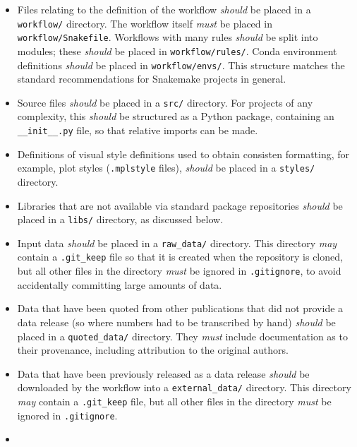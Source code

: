 \documentclass{article}
\newcommand\rfcword[1]{\emph{#1}\xspace}
\newcommand\must{\rfcword{must}}
\newcommand\should{\rfcword{should}}
\newcommand\may{\rfcword{may}}
\newcommand\filename[1]{\texttt{#1}\xspace}
\begin{document}
\begin{itemize}
  \item
        Files relating to the definition of the workflow \should be placed in a \filename{workflow/} directory.
        The workflow itself \must be placed in \filename{workflow/Snakefile}.
        Workflows with many rules \should be split into modules;
        these \should be placed in \filename{workflow/rules/}.
        Conda environment definitions \should be placed in \filename{workflow/envs/}.
        This structure matches the standard recommendations for Snakemake projects in general.
  \item
        Source files \should be placed in a \filename{src/} directory.
        For projects of any complexity,
        this \should be structured as a Python package,
        containing an \filename{\_\_init\_\_.py} file,
        so that relative imports can be made.
  \item
        Definitions of visual style definitions used to obtain consisten formatting,
        for example,
        plot styles (\verb|.mplstyle| files),
        \should be placed in a \filename{styles/} directory.
  \item
        Libraries that are not available via standard package repositories
        \should be placed in a \filename{libs/} directory,
        as discussed below.
  \item
        Input data \should be placed in a \filename{raw\_data/} directory.
        This directory \may contain a \filename{.git\_keep} file
        so that it is created when the repository is cloned,
        but all other files in the directory \must be ignored in \filename{.gitignore},
        to avoid accidentally committing large amounts of data.
  \item
        Data that have been quoted from other publications
        that did not provide a data release
        (so where numbers had to be transcribed by hand)
        \should be placed in a \filename{quoted\_data/} directory.
        They \must include documentation as to their provenance,
        including attribution to the original authors.
  \item
        Data that have been previously released as a data release
        \should be downloaded by the workflow
        into a \filename{external\_data/} directory.
        This directory \may contain a \filename{.git\_keep} file,
        but all other files in the directory \must be ignored in \filename{.gitignore}.
  \item

\end{itemize}
\end{document}
